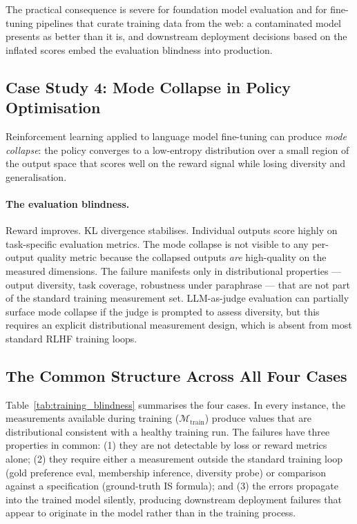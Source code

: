 \documentclass{article}
\begin{document}
The practical consequence is severe for foundation model evaluation and for
fine-tuning pipelines that curate training data from the web: a contaminated
model presents as better than it is, and downstream deployment decisions
based on the inflated scores embed the evaluation blindness into production.

\subsection{Case Study 4: Mode Collapse in Policy Optimisation}

Reinforcement learning applied to language model fine-tuning can produce
\emph{mode collapse}: the policy converges to a low-entropy distribution
over a small region of the output space that scores well on the reward
signal while losing diversity and generalisation.

\paragraph{The evaluation blindness.}
Reward improves.  KL divergence stabilises.  Individual outputs score
highly on task-specific evaluation metrics.  The mode collapse is not
visible to any per-output quality metric because the collapsed outputs
\emph{are} high-quality on the measured dimensions.  The failure manifests
only in distributional properties --- output diversity, task coverage,
robustness under paraphrase --- that are not part of the standard training
measurement set.  LLM-as-judge evaluation \citep{zheng2024judgellm} can
partially surface mode collapse if the judge is prompted to assess
diversity, but this requires an explicit distributional measurement design,
which is absent from most standard RLHF training loops.

\subsection{The Common Structure Across All Four Cases}

Table~\ref{tab:training_blindness} summarises the four cases.  In every
instance, the measurements available during training ($\mathcal{M}_{\text{train}}$)
produce values that are distributional consistent with a healthy training run.
The failures have three properties in common: (1) they are not detectable by
loss or reward metrics alone; (2) they require either a measurement outside
the standard training loop (gold preference eval, membership inference,
diversity probe) or comparison against a specification (ground-truth IS
formula); and (3) the errors propagate into the trained model silently,
producing downstream deployment failures that appear to originate in the
model rather than in the training process.
\end{document}
